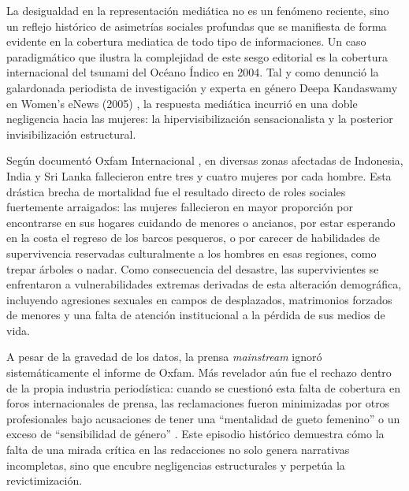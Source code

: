 
La desigualdad en la representación mediática no es un fenómeno reciente, sino un reflejo histórico de asimetrías sociales profundas que se manifiesta de forma evidente en la cobertura mediatica de todo tipo de informaciones. Un caso paradigmático que ilustra la complejidad de este sesgo editorial es la cobertura internacional del tsunami del Océano Índico en 2004. Tal y como denunció la galardonada periodista de investigación y experta en género Deepa Kandaswamy en Women's eNews (2005) \cite{kandaswamy2005}, la respuesta mediática incurrió en una doble negligencia hacia las mujeres: la hipervisibilización sensacionalista y la posterior invisibilización estructural.

Según documentó Oxfam Internacional \cite{oxfam2005}, en diversas zonas afectadas de Indonesia, India y Sri Lanka fallecieron entre tres y cuatro mujeres por cada hombre. Esta drástica brecha de mortalidad fue el resultado directo de roles sociales fuertemente arraigados: las mujeres fallecieron en mayor proporción por encontrarse en sus hogares cuidando de menores o ancianos, por estar esperando en la costa el regreso de los barcos pesqueros, o por carecer de habilidades de supervivencia reservadas culturalmente a los hombres en esas regiones, como trepar árboles o nadar. Como consecuencia del desastre, las supervivientes se enfrentaron a vulnerabilidades extremas derivadas de esta alteración demográfica, incluyendo agresiones sexuales en campos de desplazados, matrimonios forzados de menores y una falta de atención institucional a la pérdida de sus medios de vida.

A pesar de la gravedad de los datos, la prensa \textit{mainstream} ignoró sistemáticamente el informe de Oxfam. Más revelador aún fue el rechazo dentro de la propia industria periodística: cuando se cuestionó esta falta de cobertura en foros internacionales de prensa, las reclamaciones fueron minimizadas por otros profesionales bajo acusaciones de tener una ``mentalidad de gueto femenino'' o un exceso de ``sensibilidad de género'' \cite{kandaswamy2005}. Este episodio histórico demuestra cómo la falta de una mirada crítica en las redacciones no solo genera narrativas incompletas, sino que encubre negligencias estructurales y perpetúa la revictimización.



